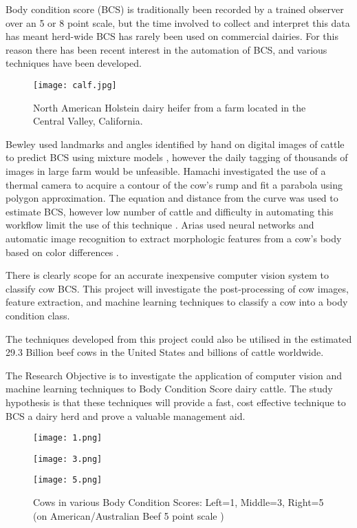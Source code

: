 \documentclass[11pt]{article}
\begin{document}
		Body condition score (BCS) is traditionally been recorded by a trained observer over an 5 or 8 point scale\cite{Bewley2010}, but the time involved to collect and interpret this data has meant herd-wide BCS has rarely been used on commercial dairies.
		For this reason there has been recent interest in the automation of BCS, and various techniques have been developed.


		\begin{figure}[b!]
			\centering
			\texttt{[image: calf.jpg]}
			\caption{North American Holstein dairy heifer from a farm located in the Central Valley, California.}
			\label{fig:}
		\end{figure}
		\newpage

		Bewley used landmarks and angles identified by hand on digital images of cattle to predict BCS using mixture models \cite{Bewley2008}, however the daily tagging of thousands of images in large farm would be unfeasible.
		Hamachi investigated the use of a thermal camera to acquire a contour of the cow's rump and fit a parabola using polygon approximation. 
		The equation and distance from the curve was used to estimate BCS, however low number of cattle and difficulty in automating this workflow limit the use of this technique \cite{Halachmi2008}. 
		Arias used neural networks and automatic image recognition to extract morphologic features from a cow's body based on color differences \cite{Arias2004}. 


		There is clearly scope for an accurate inexpensive computer vision system to classify cow BCS.
		This project will investigate the post-processing of cow images, feature extraction, and machine learning techniques to classify a cow into a body condition class.  


		The techniques developed from this project could also be utilised in the estimated 29.3 Billion beef cows in the United States\cite{USDA2013} and billions of cattle worldwide.

		The Research Objective is to investigate the application of computer vision and machine learning techniques to Body Condition Score dairy cattle.
		The study hypothesis is that these techniques will provide a fast, cost effective technique to BCS a dairy herd and prove a valuable management aid.


	\begin{figure}[h!]
		\centering
		\parbox{4cm}{\texttt{[image: 1.png]}}
		\parbox{4cm}{\texttt{[image: 3.png]}}
		\parbox{4cm}{\texttt{[image: 5.png]}}
		\caption{Cows in various Body Condition Scores: Left=1, Middle=3, Right=5 (on American/Australian Beef 5 point scale \cite{malmo2010})}
		\label{fig:}
	\end{figure}
\end{document}
